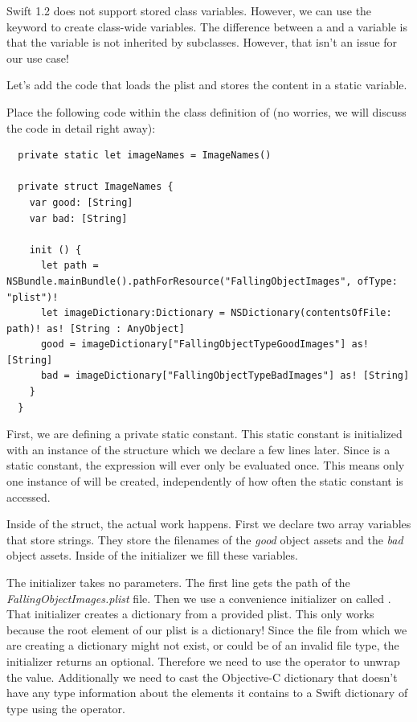 \begin{details} 
Swift 1.2 does not support stored class variables. However, we can use the
 keyword to create class-wide variables. The difference
between a  and a  variable is that the
 variable is not inherited by subclasses. However, that isn't
an issue for our use case!
\end{details}

Let's add the code that loads the plist and stores the content in a static
variable. 

\begin{leftbar}
Place the following code within the class definition of
 (no worries, we will discuss the code in detail right away):

\begin{lstlisting}
  private static let imageNames = ImageNames()

  private struct ImageNames {
    var good: [String]
    var bad: [String]
    
    init () {
      let path = NSBundle.mainBundle().pathForResource("FallingObjectImages", ofType: "plist")!
      let imageDictionary:Dictionary = NSDictionary(contentsOfFile: path)! as! [String : AnyObject]
      good = imageDictionary["FallingObjectTypeGoodImages"] as! [String]
      bad = imageDictionary["FallingObjectTypeBadImages"] as! [String]
    }
  }
\end{lstlisting}
\end{leftbar}

First, we are defining a private static constant. This static constant is
initialized with an instance of the structure  which we declare a few lines later. Since
 is a static constant, the expression will ever only be
evaluated once. This means only one instance of  will be
created, independently of how often the static constant is accessed.

Inside of the  struct, the actual work happens. First we
declare two array variables that store strings. They store the filenames of the
\textit{good} object assets and the \textit{bad} object assets. Inside of the
initializer we fill these variables.

The initializer takes no parameters. The first line gets the path of the
\textit{FallingObjectImages.plist} file. Then we use a convenience initializer
on  called . That
initializer creates a dictionary from a provided plist. This only works because
the root element of our plist is a dictionary! Since the file from which we are
creating a dictionary might not exist, or could be of an invalid file type, the
 initializer returns an optional. Therefore we need
to use the \inlinecode{!} operator to unwrap the value. Additionally we need to
cast the Objective-C dictionary that doesn't have any type information about the
elements it contains to a Swift dictionary of type  using the  operator.

